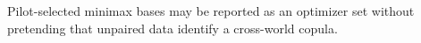 Pilot-selected minimax bases may be reported as an optimizer set without pretending that unpaired data identify a cross-world copula.